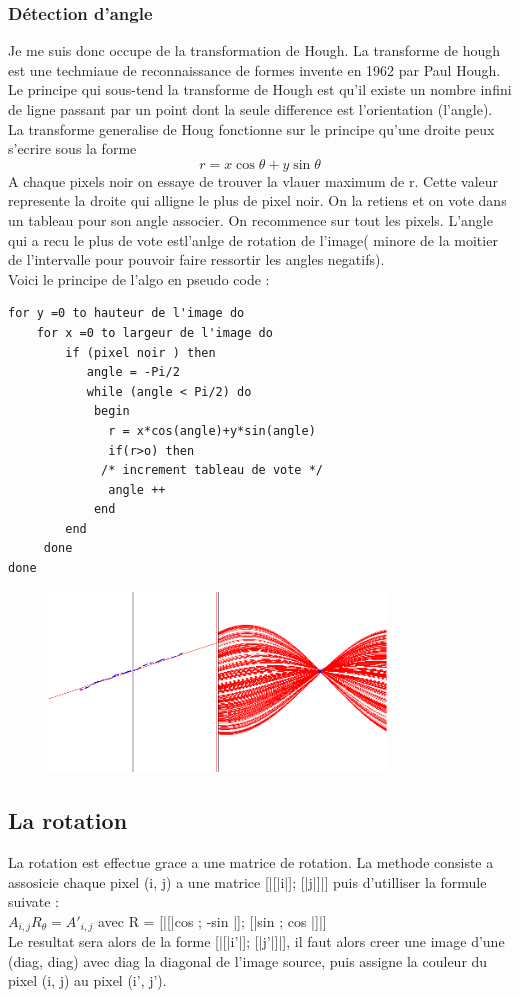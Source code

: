 \documentclass{article}
\begin{document}
\subsubsection{Détection d'angle}
Je me suis donc occupe de la transformation de Hough. La transforme de hough est une techmiaue de reconnaissance de formes invente en 1962 par Paul Hough.
Le principe qui sous-tend la transforme de Hough est qu'il existe un nombre infini de ligne passant par un point dont la seule difference est l'orientation (l'angle). La transforme generalise de Houg fonctionne sur le principe qu'une droite peux s'ecrire sous la forme 
\[r = x\cos{\theta}+y\sin{\theta}\]
A chaque pixels noir on essaye de trouver la vlauer maximum de r. Cette valeur represente la droite qui alligne le plus de pixel noir. On la retiens et on vote dans un tableau pour son angle associer. On recommence sur tout les pixels. L'angle qui a recu le plus de vote estl'anlge de rotation de l'image( minore de la moitier de l'intervalle pour pouvoir faire ressortir les angles negatifs).
\\
Voici le principe de l'algo en pseudo code :
\begin{lstlisting}
for y =0 to hauteur de l'image do
    for x =0 to largeur de l'image do
        if (pixel noir ) then
           angle = -Pi/2
           while (angle < Pi/2) do
            begin
              r = x*cos(angle)+y*sin(angle)
              if(r>o) then
             /* increment tableau de vote */          
              angle ++
            end
        end
     done
done

\end{lstlisting} 

\begin{figure}[hp]
\centering
\includegraphics[width=0.80\textwidth]{img/hough.png}
\end{figure}
\subsection{La rotation}
La rotation est effectue grace a une matrice de rotation. La methode consiste a assosicie chaque pixel (i, j) a une matrice [|[|i|]; [|j|]|] puis d'utilliser la formule suivate :
\\
$A_{i,j}R_{\theta} = A'_{i,j}$ avec R = [|[|cos \theta; -sin \theta|]; [|sin \theta; cos \theta|]|] 
\\
Le resultat sera alors de la forme [|[|i'|]; [|j'|]|], il faut alors creer une image d'une (diag, diag) avec diag la diagonal de l'image source, puis assigne la couleur du pixel (i, j) au pixel (i', j').
\end{document}
